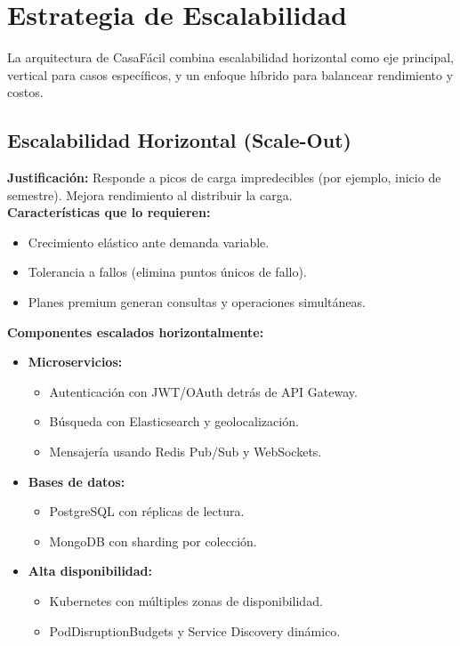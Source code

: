 \section{Estrategia de Escalabilidad}
	\noindent La arquitectura de CasaFácil combina escalabilidad horizontal como eje principal, vertical para casos específicos, y un enfoque híbrido para balancear rendimiento y costos.
	
	\subsection*{Escalabilidad Horizontal (Scale-Out)}
		\noindent \textbf{Justificación:} Responde a picos de carga impredecibles (por ejemplo, inicio de semestre). Mejora rendimiento al distribuir la carga. \\
		
		\textbf{Características que lo requieren:} 
		\begin{itemize}
			\item Crecimiento elástico ante demanda variable.
			\item Tolerancia a fallos (elimina puntos únicos de fallo).
			\item Planes premium generan consultas y operaciones simultáneas.
		\end{itemize}
		
		\textbf{Componentes escalados horizontalmente:}
		\begin{itemize}
			\item \textbf{Microservicios:}
			\begin{itemize}
				\item Autenticación con JWT/OAuth detrás de API Gateway.
				\item Búsqueda con Elasticsearch y geolocalización.
				\item Mensajería usando Redis Pub/Sub y WebSockets.
			\end{itemize}
			\item \textbf{Bases de datos:}
			\begin{itemize}
				\item PostgreSQL con réplicas de lectura.
				\item MongoDB con sharding por colección.
			\end{itemize}
			\item \textbf{Alta disponibilidad:}
			\begin{itemize}
				\item Kubernetes con múltiples zonas de disponibilidad.
				\item PodDisruptionBudgets y Service Discovery dinámico.
			\end{itemize}
		\end{itemize}
	
